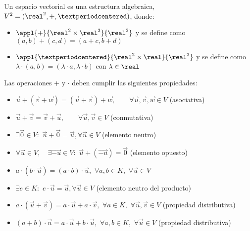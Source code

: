 \begin{defn}
Un espacio vectorial es una estructura algebraica, $V^2=(\real^2,+,·)$, donde:
\begin{itemize}
	\item $\appl{+}{\real^2\times\real^2}{\real^2}$  y se define como $(a,b)+(c,d) = (a+c,b+d)$
	\item $\appl{·}{\real^2\times\real}{\real^2}$  y se define como $\lambda·(a,b) = (\lambda·a,\lambda·b)$ con $\lambda\in\real$
\end{itemize}


Las operaciones $+$ y $·$ deben cumplir las siguientes propiedades:
\begin{itemize}
    \item $\vec{u} + (\vec{v} + \vec{w}) = (\vec{u} + \vec{v}) + \vec{w}, \qquad \forall \vec{u}, \vec{v}, \vec{w} \in V $  (asociativa)
    \item $\vec{u} + \vec{v} = \vec{v} + \vec{u}, \qquad \forall \vec{u}, \vec{v} \in V$ (conmutativa)
\item $ \exists{}\vec{0} \in{} V : $  $ \vec{u} + \vec{0} = \vec{u} , \forall{} \vec{u} \in{} V
$ (elemento neutro)

\item $
   \forall{} \vec{u} \in{} V , \quad
   \exists{} \vec{-u} \in{} V : $  $
    \vec{u} + (\vec{-u}) = \vec{0}
$ (elemento opuesto)

\item $
   \mathit{a} \cdot (\mathit{b} \cdot \vec{u})=(\mathit{a} \cdot \mathit{b}) \cdot \vec{u} ,$  $
   \forall{} \mathit{a} ,\mathit{b} \in{}K , $  $
   \forall{} \vec{u} \in{} V
$

\item$
   \exists{e} \in{K}: $  $
   e \cdot \vec{u}   = \vec{u} , 
   \forall{} \vec{u} \in{} V
$ (elemento neutro del producto)
\item $
   \mathit{a} \cdot (\vec{u}+ \vec{v}) =
   \mathit{a} \cdot \vec{u}+ \mathit{a} \cdot \vec{v} , $  $
   \forall{} \mathit{a}\in{}K , $  $
   \forall{} \vec{u}, \vec{v} \in{} V
$ (propiedad distributiva)
\item $
   (\mathit{a} + \mathit{b}) \cdot \vec{u} =
   \mathit{a} \cdot \vec{u} + \mathit{b} \cdot \vec{u} , $  $
   \forall{} \mathit{a}, \mathit{b} \in{} K , $  $
   \forall{} \vec{u} \in{} V
$ (propiedad distributiva)
\end{itemize}

\end{defn}

